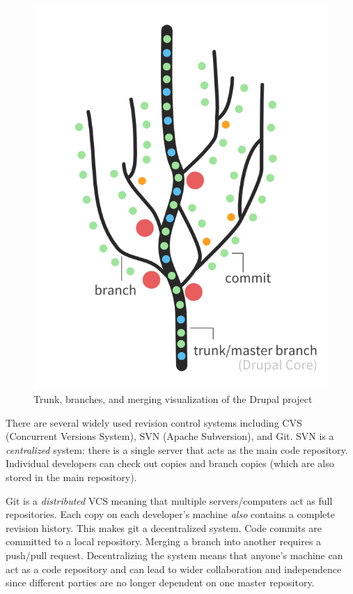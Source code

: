\documentclass[12pt]{scrartcl}
\begin{document}
\begin{figure}[h]
\centering
\includegraphics[scale=.5]{./hack1.0-files/repositorydiagram}
\caption{Trunk, branches, and merging visualization of the Drupal project}
\end{figure}

There are several widely used revision control systems including 
CVS (Concurrent Versions System), SVN (Apache Subversion), and 
Git.  SVN is a \emph{centralized} system: there is a single server that 
acts as the main code repository.  Individual developers can check out 
copies and branch copies (which are also stored in the main repository).  

Git is a \emph{distributed} VCS meaning that multiple servers/computers 
act as full repositories.  Each copy on each developer's machine 
\emph{also} contains a complete revision history.  This makes git a 
decentralized system.  Code commits are committed to a local repository.  
Merging a branch into another requires a push/pull request.  
Decentralizing the system means that anyone's 
machine can act as a code repository and can lead to wider collaboration 
and independence since different parties are no longer dependent on 
one master repository.
\end{document}
